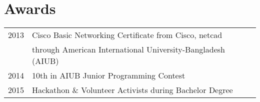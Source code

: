 \documentclass[]{deedy-resume-openfont}
\begin{document}
\begin{minipage}[t]{0.66\textwidth}
%
%

\section{Awards} 
\begin{tabular}{rl}
2013 & Cisco Basic Networking Certificate from Cisco, netcad \\
	     & through American International University-Bangladesh (AIUB)\\
2014     & 10th in AIUB Junior Programming Contest  \\
2015     & Hackathon \& Volunteer Activists during Bachelor Degree \\

\end{tabular}
\sectionsep





\end{minipage}
\end{document}
